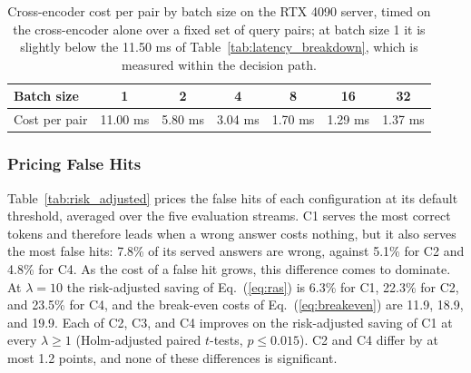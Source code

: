 \documentclass[authoryear,preprint,review,12pt]{elsarticle}
\begin{document}
\begin{table}[htbp]
\centering
\caption{Cross-encoder cost per pair by batch size on the RTX 4090 server, timed on the cross-encoder alone over a fixed set of query pairs; at batch size 1 it is slightly below the 11.50 ms of Table~\ref{tab:latency_breakdown}, which is measured within the decision path.}
\label{tab:cross_batching}
\footnotesize
\begin{tabular}{lcccccc}
\toprule
Batch size & 1 & 2 & 4 & 8 & 16 & 32 \\
\midrule
Cost per pair & 11.00 ms & 5.80 ms & 3.04 ms & 1.70 ms & 1.29 ms & 1.37 ms \\
\bottomrule
\end{tabular}
\end{table}

\subsubsection{Pricing False Hits}
\label{subsubsec:pricing_false_hits}
Table~\ref{tab:risk_adjusted} prices the false hits of each configuration at its default threshold, averaged over the five evaluation streams. C1 serves the most correct tokens and therefore leads when a wrong answer costs nothing, but it also serves the most false hits: 7.8\% of its served answers are wrong, against 5.1\% for C2 and 4.8\% for C4. As the cost of a false hit grows, this difference comes to dominate. At $\lambda=10$ the risk-adjusted saving of Eq.~(\ref{eq:ras}) is 6.3\% for C1, 22.3\% for C2, and 23.5\% for C4, and the break-even costs of Eq.~(\ref{eq:breakeven}) are 11.9, 18.9, and 19.9. Each of C2, C3, and C4 improves on the risk-adjusted saving of C1 at every $\lambda\geq 1$ (Holm-adjusted paired $t$-tests, $p\leq 0.015$). C2 and C4 differ by at most 1.2 points, and none of these differences is significant.

\begin{table}[htbp]
\centering
\caption{False hits and risk-adjusted saving at each configuration's default threshold, mean over the five evaluation streams. FDR and FHR follow Eq.~(\ref{eq:false_rates}), risk-adjusted saving Eq.~(\ref{eq:ras}), and the break-even cost Eq.~(\ref{eq:breakeven}).}
\label{tab:risk_adjusted}
\end{table}
\end{document}
